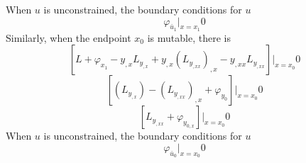 When $ u $ is unconstrained, the boundary conditions for $ u $ 
\begin{equation} \label{eq:(zxxgyl.2.7)}    
\varphi_{\bar {u}_ {1} }|_{x=x_1}  
0
\end{equation}
Similarly, when the endpoint $ x_0 $ is mutable, there is
\begin{equation} \label{eq:(zxxgyl.2.9)}    
[L+ \varphi_{x_{1}}
-y_{,x} L_{y_{,x}}   + y_{,x} \left(L_{y_{,xx}}\right)_{,x} 
-y_{,xx} L_{y_{,xx}} 
]|_{x=x_0}  
0
\end{equation}
\begin{equation} \label{eq:(zxxgyl.2.10)}    
[\left(L_{y_{,x}}  \right) -\left(L_{y_{,xx}}\right)_{,x} + \varphi_{y_{0} }]|_{x=x_0}  
0
\end{equation}
\begin{equation} \label{eq:(zxxgyl.2.11)}    
[L_{y_{,xx}}  +\varphi_{y_{0,x}}]|_{x=x_0}   
0
\end{equation}
When $ u $ is unconstrained, the boundary conditions for $ u $ 
\begin{equation} \label{eq:(zxxgyl.2.12)}    
\varphi_{\bar {u}_ {0} }|_{x=x_0}  
0
\end{equation}

